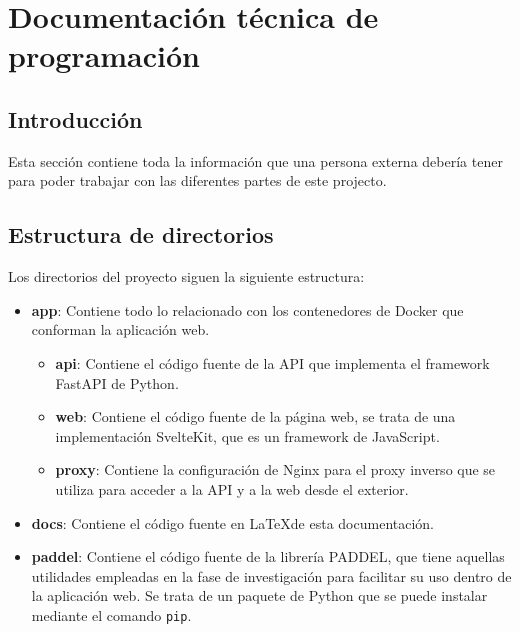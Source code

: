 \chapter{Documentación técnica de programación}
\label{cha:Documentación técnica de programación}

\section{Introducción}

Esta sección contiene toda la información que una persona externa debería tener
para poder trabajar con las diferentes partes de este projecto.


\section{Estructura de directorios}

Los directorios del proyecto siguen la siguiente estructura:

\begin{itemize}
      \item \textbf{app}: Contiene todo lo relacionado con los contenedores de
            Docker que conforman la aplicación web.
            \begin{itemize}
                  \item \textbf{api}: Contiene el código fuente de la API que
                        implementa el framework FastAPI de Python.
                  \item \textbf{web}: Contiene el código fuente de la página web, se
                        trata de una implementación SvelteKit, que es un framework
                        de JavaScript.
                  \item \textbf{proxy}: Contiene la configuración de Nginx para el
                        proxy inverso que se utiliza para acceder a la API y a la
                        web desde el exterior.
            \end{itemize}
            
      \item \textbf{docs}: Contiene el código fuente en \LaTeX de esta
            documentación.
            
      \item \textbf{paddel}: Contiene el código fuente de la librería PADDEL, que
            tiene aquellas utilidades empleadas en la fase de investigación para
            facilitar su uso dentro de la aplicación web. Se trata de un paquete
            de Python que se puede instalar mediante el comando \texttt{pip}.
\end{itemize}


